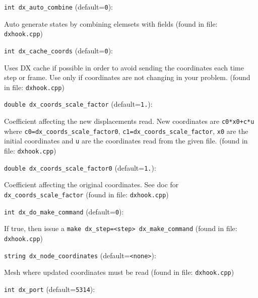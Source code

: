 \item\verb+int dx_auto_combine+ {\rm(default=\verb|0|)}:

Auto generate states by combining elemsets with fields
 (found in file: \verb+dxhook.cpp+)
\item\verb+int dx_cache_coords+ {\rm(default=\verb|0|)}:

Uses DX cache if possible in order to avoid sending the coordinates
 each time step or frame. Use only if coordinates are not changing
 in your problem. 
 (found in file: \verb+dxhook.cpp+)
\item\verb+double dx_coords_scale_factor+ {\rm(default=\verb|1.|)}:

Coefficient affecting the new displacements read. 
 New coordinates are \verb|c0*x0+c*u| where
 \verb+c0=dx_coords_scale_factor0+, \verb+c1=dx_coords_scale_factor+,
 \verb+x0+ are the initial coordinates and \verb+u+ are the coordinates read
 from the given file. 
 (found in file: \verb+dxhook.cpp+)
\item\verb+double dx_coords_scale_factor0+ {\rm(default=\verb|1.|)}:

Coefficient affecting the original coordinates. See doc for
 \verb+dx_coords_scale_factor+
 (found in file: \verb+dxhook.cpp+)
\item\verb+int dx_do_make_command+ {\rm(default=\verb|0|)}:

If true, then issue a \verb+make dx_step=<step> dx_make_command+
 (found in file: \verb+dxhook.cpp+)
\item\verb+string dx_node_coordinates+ {\rm(default=\verb|<none>|)}:

Mesh where updated coordinates must be read
 (found in file: \verb+dxhook.cpp+)
\item\verb+int dx_port+ {\rm(default=\verb|5314|)}:

